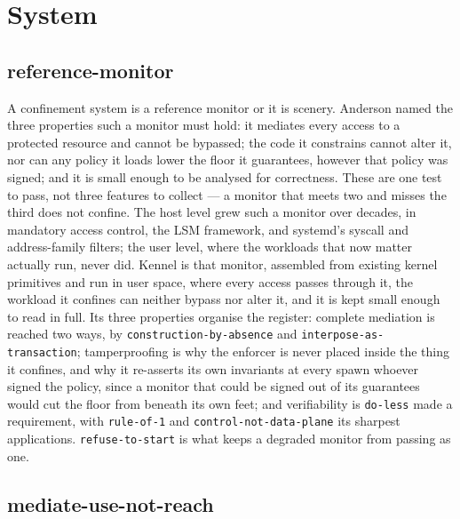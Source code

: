 \hypertarget{system}{%
\section{System}\label{system}}

\hypertarget{reference-monitor}{%
\subsection{\texorpdfstring{reference-monitor}{reference-monitor}}\label{reference-monitor}}

A confinement system is a reference monitor or it is scenery. Anderson
named the three properties such a monitor must hold: it mediates every
access to a protected resource and cannot be bypassed; the code it
constrains cannot alter it, nor can any policy it loads lower the floor
it guarantees, however that policy was signed; and it is small enough to
be analysed for correctness. These are one test to pass, not three
features to collect --- a monitor that meets two and misses the third
does not confine. The host level grew such a monitor over decades, in
mandatory access control, the LSM framework, and systemd's syscall and
address-family filters; the user level, where the workloads that now
matter actually run, never did. Kennel is that monitor, assembled from
existing kernel primitives and run in user space, where every access
passes through it, the workload it confines can neither bypass nor alter
it, and it is kept small enough to read in full. Its three properties
organise the register: complete mediation is reached two ways, by
\texttt{construction-by-absence} and \texttt{interpose-as-transaction};
tamperproofing is why the enforcer is never placed inside the thing it
confines, and why it re-asserts its own invariants at every spawn
whoever signed the policy, since a monitor that could be signed out of
its guarantees would cut the floor from beneath its own feet; and
verifiability is \texttt{do-less} made a requirement, with
\texttt{rule-of-1} and \texttt{control-not-data-plane} its sharpest
applications. \texttt{refuse-to-start} is what keeps a degraded monitor
from passing as one.

\hypertarget{mediate-use-not-reach}{%
\subsection{\texorpdfstring{mediate-use-not-reach}{mediate-use-not-reach}}\label{mediate-use-not-reach}}

